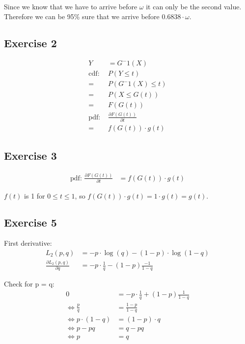 Since we know that we have to arrive before $\omega$ it can only be the second value. Therefore we can be 95\% sure that we arrive before $0.6838 \cdot \omega$.


\subsection*{Exercise 2}
\begin{align*}
Y &= G^-1(X) \\
\mbox{cdf: }   &P\left(Y \leq t\right) \\
             = &P\left(G^-1\left(X\right) \leq t\right) \\
             = &P\left(X \leq G\left(t\right)\right) \\
             = &F\left(G\left(t\right)\right) \\
\mbox{pdf: }   &\frac{\partial F\left(G\left(t\right)\right)}{\partial t} \\
             = &f\left(G\left(t\right)\right) \cdot g\left(t\right)
\end{align*}

\subsection*{Exercise 3}
\begin{align*}
\mbox{pdf: } \frac{\partial F\left(G\left(t\right)\right)}{\partial t} &=f\left(G\left(t\right)\right) \cdot g\left(t\right)
\end{align*}

$f(t)$ is 1 for $0 \leq t \leq 1$, so $f\left(G\left(t\right)\right) \cdot g\left(t\right) = 1 \cdot g\left(t\right) = g\left(t\right)$.


\subsection*{Exercise 5}
First derivative:
\begin{align*}
L_2\left(p,q\right) &= -p \cdot \log{\left(q\right)} - \left(1 - p\right) \cdot \log{\left(1-q\right)} \\
\frac{\partial L_2\left(p, q\right)}{\partial q} &= -p \cdot \frac{1}{q} - \left(1 - p\right) \frac{-1}{1-q}
\end{align*}

Check for p = q:
\begin{align*}
0 &= -p \cdot \frac{1}{q} + \left(1 - p\right) \frac{1}{1-q} \\
\Leftrightarrow \frac{p}{q} &= \frac{1-p}{1-q} \\
\Leftrightarrow p \cdot \left(1 - q\right) &= \left(1 - p\right) \cdot q \\
\Leftrightarrow p - pq &= q - pq \\
\Leftrightarrow p &= q
\end{align*}

